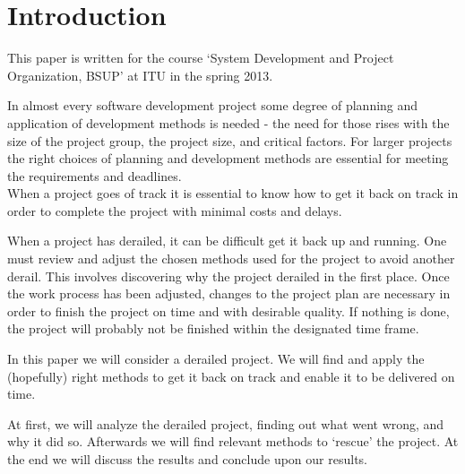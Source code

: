 \section{Introduction}
This paper is written for the course `System Development and Project Organization, BSUP' at ITU in the spring 2013.

In almost every software development project some degree of planning and application of development methods is needed - the need for those rises with the size of the project group, the project size, and critical factors. For larger projects the right choices of planning and development methods are essential for meeting the requirements and deadlines.\\
When a project goes of track it is essential to know how to get it back on track in order to complete the project with minimal costs and delays. %

When a project has derailed, it can be difficult get it back up and running. One must review and adjust the chosen methods used for the project to avoid another derail. This involves discovering why the project derailed in the first place.
Once the work process has been adjusted, changes to the project plan are necessary in order to finish the project on time and with desirable quality. If nothing is done, the project will probably not be finished within the designated time frame.

In this paper we will consider a derailed project. We will find and apply the (hopefully) right methods to get it back on track and enable it to be delivered on time.

At first, we will analyze the derailed project, finding out what went wrong, and why it did so. Afterwards we will find relevant methods to `rescue' the project. At the end we will discuss the results and conclude upon our results.
\newpage